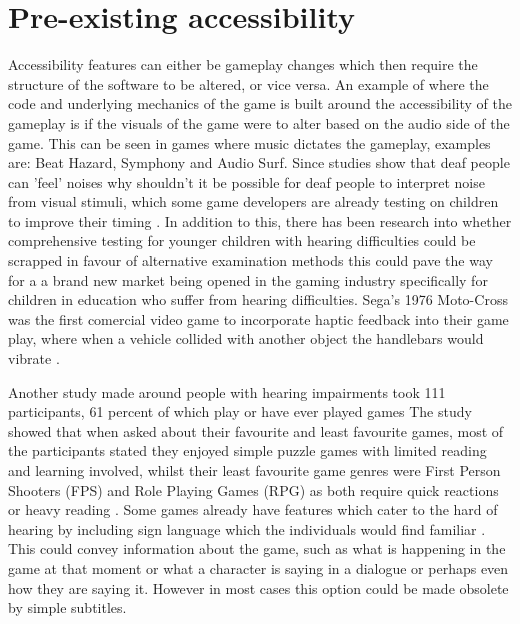 \documentclass{scrartcl}
\begin{document}
\section{Pre-existing accessibility}
Accessibility features can either be gameplay changes which then require the structure of the software to be altered, or vice versa. An example of where the code and underlying mechanics of the game is built around the accessibility of the gameplay is if the visuals of the game were to alter based on the audio side of the game. This can be seen in games where music dictates the gameplay, examples are: Beat Hazard\cite {game:beathazard}, Symphony\cite {game:symphony} and Audio Surf\cite {game:audiosurf}. Since studies show that deaf people can 'feel' noises \cite {Nanayakkara} why shouldn't it be possible for deaf people to interpret noise from visual stimuli, which some game developers are already testing on children to improve their timing  \cite {Jouhtimaki}. In addition to this, there has been research into whether comprehensive testing for younger children with hearing difficulties could be scrapped in favour of alternative examination methods \cite{Mich} this could pave the way for a a brand new market being opened in the gaming industry specifically for children in education who suffer from hearing difficulties. Sega's 1976 Moto-Cross was the first comercial video game to incorporate haptic feedback into their game play, where when a vehicle collided with another object the handlebars would vibrate \cite {Sega}. 

 Another study made around people with hearing impairments took 111 participants, 61 percent of which play or have ever played games\cite {Coutinho} The study showed that when asked about their favourite and least favourite games, most of the participants stated they enjoyed simple puzzle games with limited reading and learning involved, whilst their least favourite game genres were First Person Shooters (FPS) and Role Playing Games (RPG) as both require quick reactions or heavy reading \cite {Coutinho}. Some games already have features which cater to the hard of hearing by including sign language which the individuals would find familiar \cite{Bouzid}. This could convey information about the game, such as what is happening in the game at that moment or what a character is saying in a dialogue or perhaps even how they are saying it. However in most cases this option could be made obsolete by simple subtitles.
\end{document}
